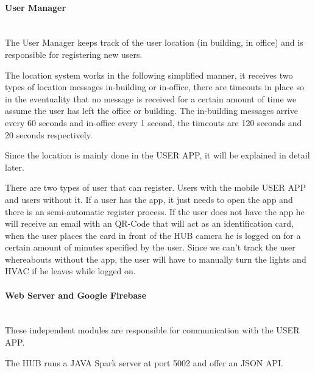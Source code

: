 \paragraph{User Manager}\mbox{}\\


The User Manager keeps track of the user location (in building, in office) and is responsible for registering new users.

The location system works in the following simplified manner, it receives two types of location messages in-building or in-office, there are timeouts in place so in the eventuality that no message is received for a certain amount of time we assume the user has left the office or building. The in-building messages arrive every 60 seconds and in-office every 1 second, the timeouts are 120 seconds and 20 seconds respectively.

Since the location is mainly done in the USER APP, it will be explained in detail later.


There are two types of user that can register. Users with the mobile USER APP and users without it. If a user has the app, it just needs to open the app and there is an semi-automatic register process. If the user does not have the app he will receive an email with an QR-Code that will act as an identification card, when the user places the card in front of the HUB camera he is logged on for a certain amount of minutes specified by the user. Since we can't track the user whereabouts without the app, the user will have to manually turn the lights and \ac{HVAC} if he leaves while logged on.



\paragraph{Web Server and Google Firebase}\mbox{}\\

These independent modules are responsible for communication with the USER APP.

The HUB runs a JAVA Spark server at port 5002 and offer an \ac{JSON} API.

